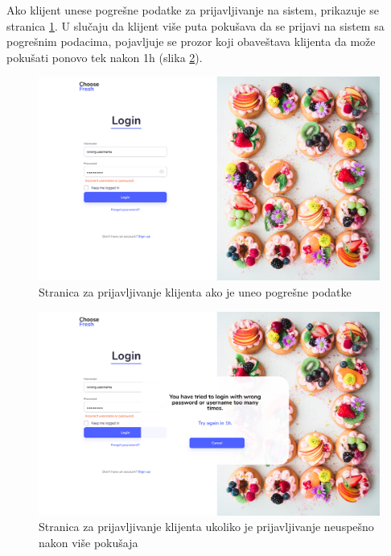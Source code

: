 Ako klijent unese pogrešne podatke za prijavljivanje na sistem, prikazuje se stranica \ref{fig:WrongInput}. U slučaju da klijent više puta pokušava da se prijavi na sistem sa pogrešnim podacima, pojavljuje se prozor koji obaveštava klijenta da može pokušati ponovo tek nakon 1h (slika \ref{fig:BruteForceAttack}).
\begin{figure}[H]
	\begin{center}
		\includegraphics[width=\textwidth]{UI/WrongInput.jpg}
    		\caption{Stranica za prijavljivanje klijenta ako je uneo pogrešne podatke}
    \label{fig:WrongInput}
    \end{center}
\end{figure}

\begin{figure}[H]
	\begin{center}
		\includegraphics[width=\textwidth]{UI/BruteForceAttack.jpg}
    		\caption{Stranica za prijavljivanje klijenta ukoliko je prijavljivanje neuspešno nakon više pokušaja}
    \label{fig:BruteForceAttack}
    \end{center}
\end{figure}
